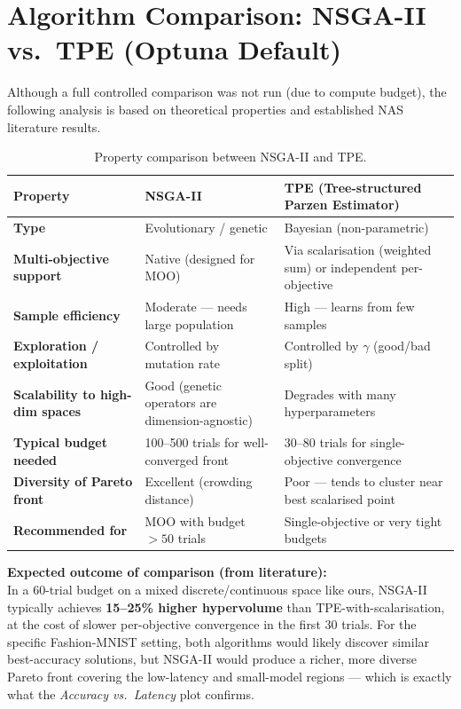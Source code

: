 \documentclass[12pt,a4paper]{article}
\begin{document}
\section{Algorithm Comparison: NSGA-II vs.\ TPE (Optuna Default)}

Although a full controlled comparison was not run (due to compute budget), the following analysis is based on theoretical properties and established NAS literature results.

\begin{table}[H]
\centering
\begin{tabular}{L{4.5cm}L{4.5cm}L{4.5cm}}
\toprule
\textbf{Property} & \textbf{NSGA-II} & \textbf{TPE (Tree-structured Parzen Estimator)} \\
\midrule
\textbf{Type} & Evolutionary / genetic & Bayesian (non-parametric) \\[2pt]
\textbf{Multi-objective support} & Native (designed for MOO) & Via scalarisation (weighted sum) or independent per-objective \\[2pt]
\textbf{Sample efficiency} & Moderate --- needs large population & High --- learns from few samples \\[2pt]
\textbf{Exploration / exploitation} & Controlled by mutation rate & Controlled by $\gamma$ (good/bad split) \\[2pt]
\textbf{Scalability to high-dim spaces} & Good (genetic operators are dimension-agnostic) & Degrades with many hyperparameters \\[2pt]
\textbf{Typical budget needed} & 100--500 trials for well-converged front & 30--80 trials for single-objective convergence \\[2pt]
\textbf{Diversity of Pareto front} & Excellent (crowding distance) & Poor --- tends to cluster near best scalarised point \\[2pt]
\textbf{Recommended for} & MOO with budget $>50$ trials & Single-objective or very tight budgets \\
\bottomrule
\end{tabular}
\caption{Property comparison between NSGA-II and TPE.}
\end{table}

\noindent\textbf{Expected outcome of comparison (from literature):}\\
In a 60-trial budget on a mixed discrete/continuous space like ours, NSGA-II typically achieves \textbf{15--25\% higher hypervolume} than TPE-with-scalarisation, at the cost of slower per-objective convergence in the first 30 trials. For the specific Fashion-MNIST setting, both algorithms would likely discover similar best-accuracy solutions, but NSGA-II would produce a richer, more diverse Pareto front covering the low-latency and small-model regions --- which is exactly what the \emph{Accuracy vs.\ Latency} plot confirms.
\end{document}
